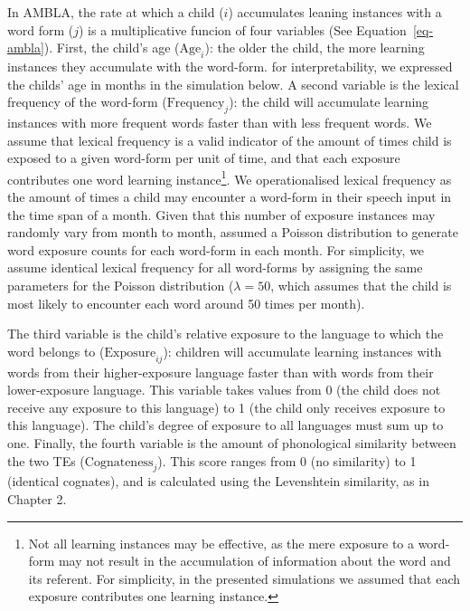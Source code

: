 \documentclass[
  12pt,
  b5paperpaper,
  twoside]{scrreprt}
\begin{document}
In AMBLA, the rate at which a child (\(i\)) accumulates leaning
instances with a word form (\(j\)) is a multiplicative funcion of four
variables (See Equation~\ref{eq-ambla}). First, the child's age
(\(\text{Age}_i\)): the older the child, the more learning instances
they accumulate with the word-form. for interpretability, we expressed
the childs' age in months in the simulation below. A second variable is
the lexical frequency of the word-form (\(\text{Frequency}_j\)): the
child will accumulate learning instances with more frequent words faster
than with less frequent words. We assume that lexical frequency is a
valid indicator of the amount of times child is exposed to a given
word-form per unit of time, and that each exposure contributes one word
learning instance\footnote{Not all learning instances may be effective,
  as the mere exposure to a word-form may not result in the accumulation
  of information about the word and its referent. For simplicity, in the
  presented simulations we assumed that each exposure contributes one
  learning instance.}. We operationalised lexical frequency as the
amount of times a child may encounter a word-form in their speech input
in the time span of a month. Given that this number of exposure
instances may randomly vary from month to month, assumed a Poisson
distribution to generate word exposure counts for each word-form in each
month. For simplicity, we assume identical lexical frequency for all
word-forms by assigning the same parameters for the Poisson distribution
(\(\lambda = 50\), which assumes that the child is most likely to
encounter each word around 50 times per month).

The third variable is the child's relative exposure to the language to
which the word belongs to (\(\text{Exposure}_{ij}\)): children will
accumulate learning instances with words from their higher-exposure
language faster than with words from their lower-exposure language. This
variable takes values from 0 (the child does not receive any exposure to
this language) to 1 (the child only receives exposure to this language).
The child's degree of exposure to all languages must sum up to one.
Finally, the fourth variable is the amount of phonological similarity
between the two TEs (\(\text{Cognateness}_j\)). This score ranges from 0
(no similarity) to 1 (identical cognates), and is calculated using the
Levenshtein similarity, as in Chapter 2.
\end{document}
